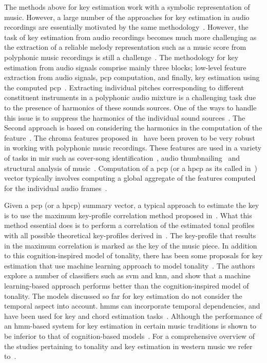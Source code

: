 The methods above for key estimation work with a symbolic representation of music. However, a large number of the approaches for key estimation in audio recordings are essentially motivated by the same methodology~\citep{gomez2006tonal,pauws2004musical,peeters2006chroma}. However, the task of key estimation from audio recordings becomes much more challenging as the extraction of a reliable melody representation such as a music score from polyphonic music recordings is still a challenge~\citep{gomez2006tonal}. The methodology for key estimation from audio signals comprise mainly three blocks; low-level feature extraction from audio signals, \gls{pcp} computation, and finally, key estimation using the computed \gls{pcp}~\cite{peeters2006chroma}. Extracting individual pitches corresponding to different constituent instruments in a polyphonic audio mixture is a challenging task due to the presence of harmonics of these sounds sources. One of the ways to handle this issue is to suppress the harmonics of the individual sound sources~\citep{cremer2004a,peeters2006chroma}. The Second approach is based on considering the harmonics in the computation of the feature~\citep{gomez2006tonal,izmirli2005template}. The chroma features proposed in~\cite{gomez2006tonal} have been proven to be very robust in working with polyphonic music recordings. These features are used in a variety of tasks in \gls{mir} such as cover-song identification~\citep{joan_thesis}, audio thumbnailing~\citep{bartsch2001catch} and structural analysis of music~\citep{paulus2006music}. Computation of a \gls{pcp} (or a \gls{hpcp} as its called in~\cite{gomez2006tonal}) vector typically involves computing a global aggregate of the features computed for the individual audio frames~\citep{izmirli2005template,pauws2004musical}. 

Given a \gls{pcp} (or a \gls{hpcp}) summary vector, a typical approach to estimate the key is to use the maximum key-profile correlation method proposed in~\cite{krumhansl2001cognitive}. What this method essential does is to perform a correlation of the estimated tonal profiles with all possible theoretical key-profiles derived in~\cite{KrumhanslKessler82}. The key-profile that results in the maximum correlation is marked as the key of the music piece. In addition to this cognition-inspired model of tonality, there has been some proposals for key estimation that use machine learning approach to model tonality~\citep{gomez2004estimating}. The authors explore a number of classifiers such as \gls{svm} and \gls{knn}, and show that a machine learning-based approach performs better than the cognition-inspired model of tonality. The models discussed so far for key estimation do not consider the temporal aspect into account. \glspl{hmm} can incorporate temporal dependencies, and have been used for key and chord estimation tasks~\cite{noland2006key,peeters2006musical,papadopoulos2007large}. Although the performance of an \gls{hmm}-based system for key estimation in certain music traditions is shown to be inferior to that of cognition-based models~\cite{peeters2006musical}. For a comprehensive overview of the studies pertaining to tonality and key estimation in western music we refer to~\cite{gomez2006tonal}.

